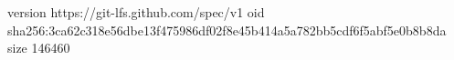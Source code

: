 version https://git-lfs.github.com/spec/v1
oid sha256:3ca62c318e56dbe13f475986df02f8e45b414a5a782bb5cdf6f5abf5e0b8b8da
size 146460
